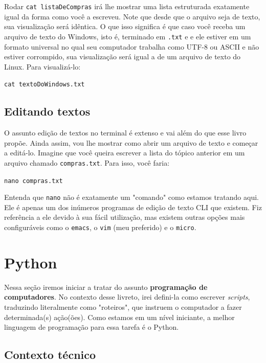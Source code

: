 \documentclass{article}
\begin{document}
	Rodar \texttt{cat listaDeCompras} irá lhe mostrar uma lista estruturada exatamente igual da forma como você a escreveu. 
	Note que desde que o arquivo seja de texto, sua visualização será idêntica. O que isso significa é que caso você receba um 
	arquivo de texto do Windows, isto é, terminado em \texttt{.txt} e e ele estiver em um formato universal no qual 
	seu computador trabalha como UTF-8 ou ASCII e não estiver corrompido, sua visualização será igual a de um arquivo 
	de texto do Linux. Para visualizá-lo: 

	\vspace{1ex}
	\texttt{cat textoDoWindows.txt} 
	\vspace{1ex} 

	\subsection{Editando textos} 

	O assunto edição de textos no terminal é extenso e vai além do que esse livro propõe. Ainda assim, vou lhe mostrar como abrir 
	um arquivo de texto e começar a editá-lo. Imagine que você queira escrever a lista do tópico anterior em um arquivo chamado 
	\texttt{compras.txt}. Para isso, você faria: 
	
	\vspace{1ex} 
	\texttt{nano compras.txt} 
	\vspace{1ex}

	Entenda que \texttt{nano} não é exatamente um "comando" como estamos tratando aqui. Ele é apenas um dos inúmeros 
	programas de edição de texto CLI que existem. Fiz referência a ele devido à sua fácil utilização, mas existem
	outras opções mais configuráveis como o \texttt{emacs}, o \texttt{vim} (meu preferido) e o \texttt{micro}. 

	\newpage

	\section{Python} 

	Nessa seção iremos iniciar a tratar do assunto \textbf{programação de computadores}. No contexto desse livreto, 
	irei defini-la como escrever \textit{scripts}, traduzindo literalmente como "roteiros", que instruem o computador a fazer
	determinada(s) ação(ões). Como estamos em um nível iniciante, a melhor linguagem de programação para essa tarefa 
	é o Python. 

	\subsection{Contexto técnico} 
\end{document}
